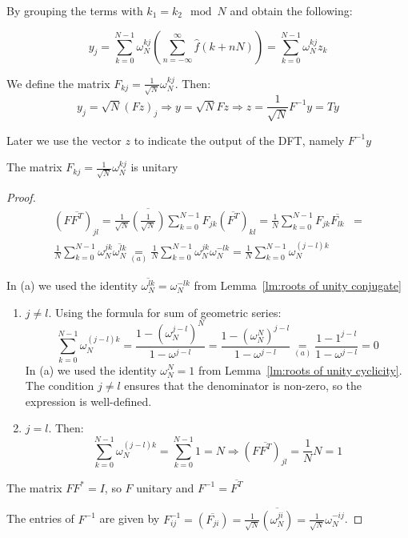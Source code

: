 By grouping the terms with $k_1 = k_2 \mod N$ and obtain the following:

\begin{equation}
	y_j
	= \sum_{k = 0}^{N-1} \omega_N^{kj} \left(\sum_{n=-\infty}^{\infty} \hat{f}(k+nN) \right)
	= \sum_{k =0}^{N-1} \omega_N^{kj} z_k
	\label{eq:IDFT unnormalized}
\end{equation}

We define the matrix $F_{kj} = \frac{1}{\sqrt N} \omega_N^{kj}$. Then:
\begin{equation}
	y_j = \sqrt{N}{(Fz)}_j \Rightarrow
	y = \sqrt{N}Fz \Rightarrow
	z = \frac{1}{\sqrt{N}}F^{-1}y
	= Ty
	\label{eq:DFT unnormalized}
\end{equation}

Later we use the vector $z$ to indicate the output of the DFT, namely $F^{-1}y$

\begin{theorem} \label{thm:DFT unitary}
	The matrix $F_{kj} = \frac{1}{\sqrt N} \omega_N^{kj}$ is unitary
\end{theorem}
\begin{proof}
	\[\begin{aligned}
			{(F \overline{F^T})}_{jl}
			= \frac{1}{\sqrt N}\overline{\left(\frac{1}{\sqrt N}\right)}\sum_{k=0}^{N-1}F_{jk}{(\overline{F^T})}_{kl}
			= \frac{1}{N} \sum_{k=0}^{N-1}F_{jk}\overline{F_{lk}}
			 & = \\ \frac{1}{N} \sum_{k=0}^{N-1}\omega_N^{jk}\overline{\omega_N^{lk}}
			\underset{(a)}{=} \frac{1}{N} \sum_{k=0}^{N-1}\omega_N^{jk}\omega_N^{-lk}
			= \frac{1}{N} \sum_{k=0}^{N-1}\omega_N^{(j-l)k}
		\end{aligned}\]

	In (a) we used the identity $\overline{\omega_N^{lk}} = \omega_N^{-lk}$ from Lemma~\ref{lm:roots of unity conjugate}

	\begin{enumerate}
		\item $j \neq l$. Using the formula for sum of geometric series:
		      \[
			      \sum_{k=0}^{N-1}\omega_N^{(j-l)k}
			      = \frac{1 - {\left(\omega_N^{j-l}\right)}^N}{1 - \omega^{j-l}}
			      = \frac{1 - {\left(\omega_N^{N}\right)}^{j-l}}{1 - \omega^{j-l}}
			      \underset{(a)}{=} \frac{1 - 1^{j-l}}{1 - \omega^{j-l}}
			      = 0\]
		      In (a) we used the identity $\omega_N^{N} = 1$ from Lemma~\ref{lm:roots of unity cyclicity}.
		      The condition $j \neq l$ ensures that the denominator is non-zero, so the expression is well-defined.
		\item $j = l$. Then:
		      \[\sum_{k=0}^{N-1}\omega_N^{(j-l)k}
			      = \sum_{k=0}^{N-1}1
			      = N \Rightarrow
			      {(F \overline{F^T})}_{jl} = \frac{1}{N}N=1\]
	\end{enumerate}

	The matrix $FF^* = I$, so $F$ unitary and $F^{-1}=\overline{F^T}$

	The entries of $F^{-1}$ are given by
	$F^{-1}_{ij} = (\overline{F_{ji}})
		= \frac{1}{\sqrt{N}}\overline{\left(\omega_N^{ji}\right)}
		= \frac{1}{\sqrt{N}}\omega_N^{-ij}$.
\end{proof}

